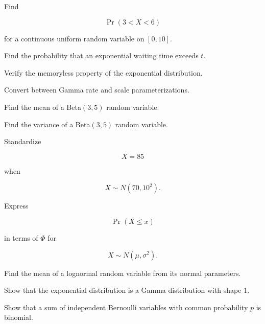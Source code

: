 \begin{exercise}[2]
Find

\[
\Pr(3<X<6)
\]

for a continuous uniform random variable on \([0,10]\).
\end{exercise}

\begin{exercise}[2]
Find the probability that an exponential waiting time exceeds \(t\).
\end{exercise}

\begin{exercise}[2]
Verify the memoryless property of the exponential distribution.
\end{exercise}

\begin{exercise}[2]
Convert between Gamma rate and scale parameterizations.
\end{exercise}

\begin{exercise}[2]
Find the mean of a Beta\((3,5)\) random variable.
\end{exercise}

\begin{exercise}[2]
Find the variance of a Beta\((3,5)\) random variable.
\end{exercise}

\begin{exercise}[2]
Standardize

\[
X=85
\]

when

\[
X\sim N(70,10^2).
\]
\end{exercise}

\begin{exercise}[2]
Express

\[
\Pr(X\leq x)
\]

in terms of \(\Phi\) for

\[
X\sim N(\mu,\sigma^2).
\]
\end{exercise}

\begin{exercise}[2]
Find the mean of a lognormal random variable from its normal parameters.
\end{exercise}

\begin{exercise}[2]
Show that the exponential distribution is a Gamma distribution with shape
\(1\).
\end{exercise}

\begin{exercise}[3]
Show that a sum of independent Bernoulli variables with common probability
\(p\) is binomial.
\end{exercise}

